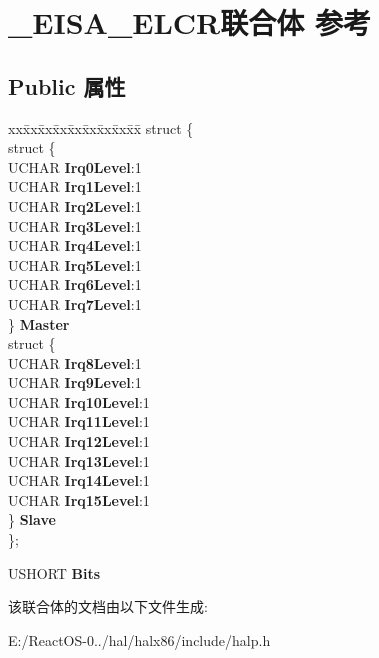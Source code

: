 \hypertarget{union___e_i_s_a___e_l_c_r}{}\section{\+\_\+\+E\+I\+S\+A\+\_\+\+E\+L\+C\+R联合体 参考}
\label{union___e_i_s_a___e_l_c_r}
\subsection*{Public 属性}
\begin{DoxyCompactItemize}
\item 
\mbox{\label{union___e_i_s_a___e_l_c_r_a7e49f251bb4edd486f9fe1cb1cb1b1b6}} 
\begin{tabbing}
xx\=xx\=xx\=xx\=xx\=xx\=xx\=xx\=xx\=\kill
struct \{\\
\>struct \{\\
\>\>UCHAR {\bfseries Irq0Level}:1\\
\>\>UCHAR {\bfseries Irq1Level}:1\\
\>\>UCHAR {\bfseries Irq2Level}:1\\
\>\>UCHAR {\bfseries Irq3Level}:1\\
\>\>UCHAR {\bfseries Irq4Level}:1\\
\>\>UCHAR {\bfseries Irq5Level}:1\\
\>\>UCHAR {\bfseries Irq6Level}:1\\
\>\>UCHAR {\bfseries Irq7Level}:1\\
\>\} {\bfseries Master}\\
\>struct \{\\
\>\>UCHAR {\bfseries Irq8Level}:1\\
\>\>UCHAR {\bfseries Irq9Level}:1\\
\>\>UCHAR {\bfseries Irq10Level}:1\\
\>\>UCHAR {\bfseries Irq11Level}:1\\
\>\>UCHAR {\bfseries Irq12Level}:1\\
\>\>UCHAR {\bfseries Irq13Level}:1\\
\>\>UCHAR {\bfseries Irq14Level}:1\\
\>\>UCHAR {\bfseries Irq15Level}:1\\
\>\} {\bfseries Slave}\\
\}; \\

\end{tabbing}\item 
\mbox{\label{union___e_i_s_a___e_l_c_r_ac3813ba562776b50c1996cb2ac9d4827}} 
U\+S\+H\+O\+RT {\bfseries Bits}
\end{DoxyCompactItemize}


该联合体的文档由以下文件生成\+:\begin{DoxyCompactItemize}
\item 
E\+:/\+React\+O\+S-\/0../hal/halx86/include/halp.\+h\end{DoxyCompactItemize}
